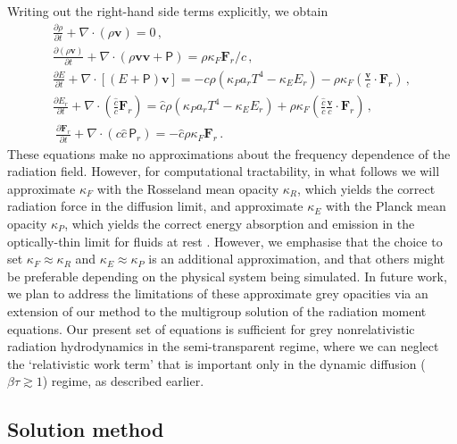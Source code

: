 \documentclass[fleqn,usenatbib]{mnras}
\newcommand{\vc}[1]{{\mathbf{#1}}}
\begin{document}
Writing out the right-hand side terms explicitly, we obtain
\begin{align}
    \label{eq:hydro_continuity}
    \frac{\partial \rho}{\partial t} + \nabla \cdot (\rho \vc{v}) = 0 \, , \\
    \label{eq:hydro_momentum}
    \frac{\partial (\rho \vc{v})}{\partial t} + \nabla \cdot (\rho \vc{v} \vc{v} + \mathsf{P}) = \rho \kappa_F {\vc{F}_r / c} \, , \\
    \label{eq:hydro_energy}
    \frac{\partial E}{\partial t} + \nabla \cdot \left[(E + \mathsf{P})\vc{v}\right] = -c \rho (\kappa_P a_r T^4 - \kappa_E E_r) - \rho \kappa_F \left( \frac{\vc{v}}{c} \cdot \vc{F}_r \right) \, , \\
    \label{eq:rad_energy}
    \frac{\partial E_r}{\partial t} + \nabla \cdot \left( \frac{\hat c}{c} \vc{F}_r \right) = \hat c \rho \left(\kappa_P a_r T^4 - \kappa_E E_r \right) + \rho \kappa_F \left( \frac{\hat c}{c} \frac{\vc{v}}{c} \cdot \vc{F}_r \right) \, , \\\
    \label{eq:rad_flux}
    \frac{\partial \vc{F}_r}{\partial t} + \nabla \cdot (c \hat c \, \mathsf{P}_r) = -\hat c \rho \kappa_F \vc{F}_r \, .
\end{align}
These equations make no approximations about the frequency dependence of the radiation field. However, for computational tractability, in what follows we will approximate $\kappa_F$ with the Rosseland mean opacity $\kappa_R$, which yields the correct radiation force in the diffusion limit, and approximate $\kappa_E$ with the Planck mean opacity $\kappa_P$, which yields the correct energy absorption and emission in the optically-thin limit for fluids at rest \citep{Mihalas_1984}. However, we emphasise that the choice to set $\kappa_F \approx \kappa_R$ and $\kappa_E \approx \kappa_P$ is an additional approximation, and that others might be preferable depending on the physical system being simulated.  In future work, we plan to address the limitations of these approximate grey opacities via an extension of our method to the multigroup solution of the radiation moment equations.  Our present set of equations is sufficient for grey nonrelativistic radiation hydrodynamics in the semi-transparent regime, where we can neglect the `relativistic work term' that is important only in the dynamic diffusion ($\beta \tau \gtrsim 1$) regime, as described earlier.

\subsection{Solution method}
\end{document}
